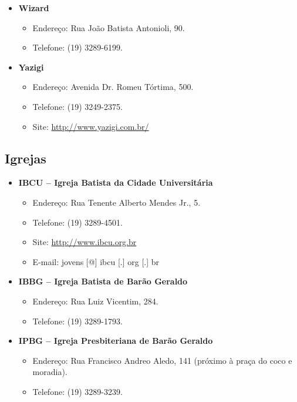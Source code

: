 \begin{itemize}
\item  \textbf{Wizard}
\begin{itemize}
\item  Endereço: Rua João Batista Antonioli, 90.
\item  Telefone: (19) 3289-6199.
\end{itemize}
\end{itemize}

\begin{itemize}
\item  \textbf{Yazigi}
\begin{itemize}
\item  Endereço: Avenida Dr. Romeu Tórtima, 500.
\item  Telefone: (19) 3249-2375.
\item  Site: \url{http://www.yazigi.com.br/}
\end{itemize}
\end{itemize}

\subsection{Igrejas}
\begin{itemize}
\item  \textbf{IBCU -- Igreja Batista da Cidade Universitária}
\begin{itemize}
\item  Endereço: Rua Tenente Alberto Mendes Jr., 5.
\item  Telefone: (19) 3289-4501.
\item  Site: \url{http://www.ibcu.org.br}
\item  E-mail: jovens [@] ibcu [.] org [.] br
\end{itemize}
\end{itemize}

\begin{itemize}
\item  \textbf{IBBG -- Igreja Batista de Barão Geraldo}
\begin{itemize}
\item  Endereço: Rua Luiz Vicentim, 284.
\item  Telefone: (19) 3289-1793.
\end{itemize}
\end{itemize}

\begin{itemize}
\item  \textbf{IPBG -- Igreja Presbiteriana de Barão Geraldo}
\begin{itemize}
\item  Endereço: Rua Francisco Andreo Aledo, 141 (próximo à praça do coco e moradia).
\item  Telefone: (19) 3289-3239.
\end{itemize}
\end{itemize}

